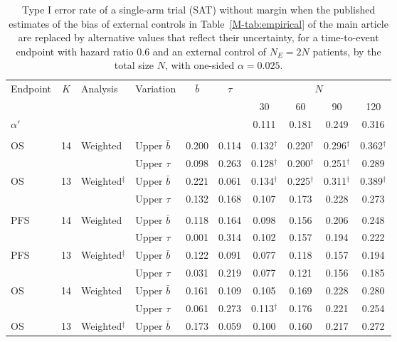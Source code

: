 \begin{table}[!htb]
\centering
\small
\setlength{\tabcolsep}{3pt}
\caption{Type I error rate of a single-arm trial (SAT) without margin when the published estimates of the bias of external controls in Table~\ref{M-tab:empirical} of the main article are replaced by alternative values that reflect their uncertainty, for a time-to-event endpoint with hazard ratio 0.6 and an external control of $N_E = 2N$ patients, by the total size $N$, with one-sided $\alpha = 0.025$.}
\label{tab:bias_uncertainty}
\begin{tabular}{lcllcccccc}
\toprule
Endpoint & $K$ & Analysis & Variation & $\bar{b}$ & $\tau$ & \multicolumn{4}{c}{$N$} \\
\cmidrule(lr){7-10}
 & & & & & & 30 & 60 & 90 & 120 \\
\midrule
\multicolumn{6}{l}{$\alpha'$} & 0.111 & 0.181 & 0.249 & 0.316 \\
\addlinespace
\multicolumn{10}{l}{Incerti et al.~\cite{Incerti2023}} \\
OS & 14 & Weighted & Upper $\bar{b}$ & 0.200 & 0.114 & 0.132$^{\dagger}$ & 0.220$^{\dagger}$ & 0.296$^{\dagger}$ & 0.362$^{\dagger}$ \\
 &  &  & Upper $\tau$ & 0.098 & 0.263 & 0.128$^{\dagger}$ & 0.200$^{\dagger}$ & 0.251$^{\dagger}$ & 0.289 \\
OS & 13 & Weighted$^{\ddagger}$ & Upper $\bar{b}$ & 0.221 & 0.061 & 0.134$^{\dagger}$ & 0.225$^{\dagger}$ & 0.311$^{\dagger}$ & 0.389$^{\dagger}$ \\
 &  &  & Upper $\tau$ & 0.132 & 0.168 & 0.107 & 0.173 & 0.228 & 0.273 \\
\addlinespace
\multicolumn{10}{l}{Bahmane et al.~\cite{Bahmane2025}} \\
PFS & 14 & Weighted & Upper $\bar{b}$ & 0.118 & 0.164 & 0.098 & 0.156 & 0.206 & 0.248 \\
 &  &  & Upper $\tau$ & 0.001 & 0.314 & 0.102 & 0.157 & 0.194 & 0.222 \\
PFS & 13 & Weighted$^{\ddagger}$ & Upper $\bar{b}$ & 0.122 & 0.091 & 0.077 & 0.118 & 0.157 & 0.194 \\
 &  &  & Upper $\tau$ & 0.031 & 0.219 & 0.077 & 0.121 & 0.156 & 0.185 \\
OS & 14 & Weighted & Upper $\bar{b}$ & 0.161 & 0.109 & 0.105 & 0.169 & 0.228 & 0.280 \\
 &  &  & Upper $\tau$ & 0.061 & 0.273 & 0.113$^{\dagger}$ & 0.176 & 0.221 & 0.254 \\
OS & 13 & Weighted$^{\ddagger}$ & Upper $\bar{b}$ & 0.173 & 0.059 & 0.100 & 0.160 & 0.217 & 0.272 \\

\end{tabular}
\end{table}
